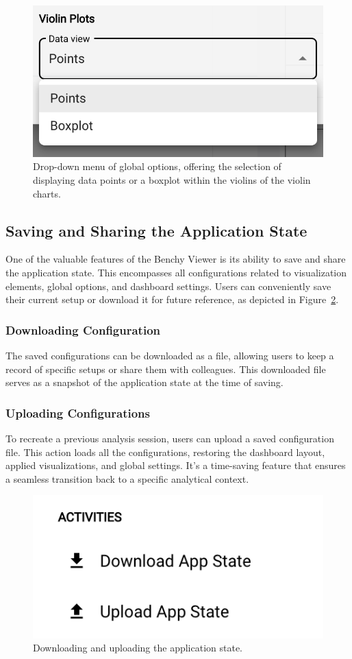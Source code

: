 \begin{figure}[h]
  \centering
  \includegraphics[width=0.4\linewidth]{figures/chart-configuration-violin.png}
  \caption{Drop-down menu of global options, offering the selection of displaying data points or a boxplot within the violins of the violin charts.}
  \label{fig:chart-configuration-violin}
\end{figure}

\subsection{Saving and Sharing the Application State}\label{sec:saving-sharing-state}

One of the valuable features of the Benchy Viewer is its ability to save and share the application state. This encompasses all configurations related to visualization elements, global options, and dashboard settings. Users can conveniently save their current setup or download it for future reference, as depicted in Figure~\ref{fig:save-upload}.

\subsubsection{Downloading Configuration}
The saved configurations can be downloaded as a file, allowing users to keep a record of specific setups or share them with colleagues. This downloaded file serves as a snapshot of the application state at the time of saving.

\subsubsection{Uploading Configurations}
To recreate a previous analysis session, users can upload a saved configuration file. This action loads all the configurations, restoring the dashboard layout, applied visualizations, and global settings. It's a time-saving feature that ensures a seamless transition back to a specific analytical context.


\begin{figure}[h]
  \vspace{0.5cm}
  \centering
  \includegraphics[width=0.4\linewidth]{figures/save-upload.png}
  \caption{Downloading and uploading the application state.}
  \label{fig:save-upload}
\end{figure}



